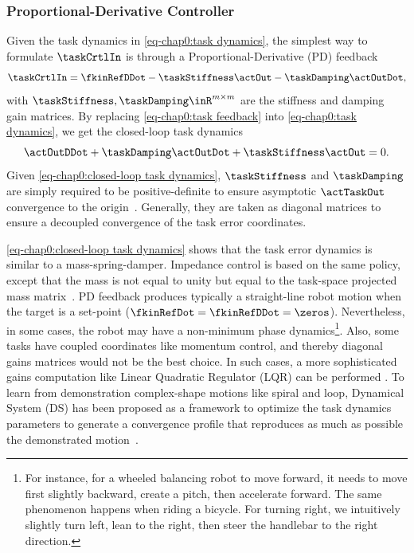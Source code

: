 \subsubsection{Proportional-Derivative Controller}
Given the task dynamics in \cref{eq-chap0:task dynamics}, the simplest way to formulate $\taskCrtlIn$ is through a Proportional-Derivative (PD) feedback \cite{abe2007siggraph,westervelt2007book,nakanishi2008ijrr,macchietto2009siggraph,delasa2010trGraph,galloway2015ieeeAccess,bouyarmane2018tac,kolathaya2019iros,englsberger2020rss}
\begin{equation}\label{eq-chap0:task feedback}
	\taskCrtlIn = \fkinRefDDot - \taskStiffness\actOut - \taskDamping	\actOutDot,
\end{equation}
with $\taskStiffness,\taskDamping\inR^{m\times m}$ are the stiffness and damping gain matrices. By replacing \cref{eq-chap0:task feedback} into \cref{eq-chap0:task dynamics}, we get the closed-loop task dynamics
\begin{equation}\label{eq-chap0:closed-loop task dynamics}
	\actOutDDot + \taskDamping\actOutDot + \taskStiffness\actOut = 0.
\end{equation}  
Given \cref{eq-chap0:closed-loop task dynamics}, $\taskStiffness$  and $\taskDamping$ are simply required to be positive-definite to ensure asymptotic $\actTaskOut$ convergence to the origin~\cite{khalil2002NonLinearSystems}. Generally, they are taken as diagonal matrices to ensure a decoupled convergence of the task error coordinates.  

\cref{eq-chap0:closed-loop task dynamics} shows that the task error dynamics is similar to a mass-spring-damper. Impedance control is based on the same policy, except that the mass is not equal to unity but equal to the task-space projected mass matrix~\cite{dietrich2016ral,dietrich2017ral,dietrich2020tro,englsberger2020rss}. PD feedback produces typically a straight-line robot motion when the target is a set-point ($\fkinRefDot=\fkinRefDDot=\zeros$). Nevertheless, in some cases, the robot may have a non-minimum phase dynamics\footnote{For instance, for a wheeled balancing robot to move forward, it needs to move first slightly backward, create a pitch, then accelerate forward. The same phenomenon happens when riding a bicycle. For turning right, we intuitively slightly turn left, lean to the right, then steer the handlebar to the right direction.}. Also, some tasks have coupled coordinates like momentum control, and thereby diagonal gains matrices would not be the best choice. In such cases, a more sophisticated gains computation like Linear Quadratic Regulator (LQR) can be performed \cite{klemm2020ral,herzog2016autonomousRobot}. To learn from demonstration complex-shape motions like spiral and loop, Dynamical System (DS) has been proposed as a framework to optimize the task dynamics parameters to generate a convergence profile that reproduces as much as possible the demonstrated motion~\cite{khansari-zadeh2011tro}. 


